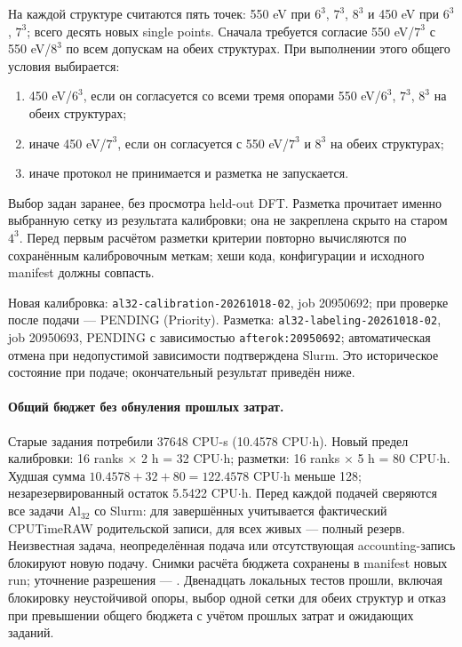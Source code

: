 \documentclass[11pt,a4paper]{article}
\begin{document}
На каждой структуре считаются пять точек: 550 eV при $6^3$, $7^3$,
$8^3$ и 450 eV при $6^3$, $7^3$; всего десять новых single points.
Сначала требуется согласие 550 eV/$7^3$ с 550 eV/$8^3$ по всем допускам
на обеих структурах. При выполнении этого общего условия выбирается:
\begin{enumerate}
\item 450 eV/$6^3$, если он согласуется со всеми тремя опорами
550 eV/$6^3$, $7^3$, $8^3$ на обеих структурах;
\item иначе 450 eV/$7^3$, если он согласуется с 550 eV/$7^3$ и $8^3$
на обеих структурах;
\item иначе протокол не принимается и разметка не запускается.
\end{enumerate}
Выбор задан заранее, без просмотра held-out DFT. Разметка прочитает
именно выбранную сетку из результата калибровки; она не закреплена скрыто
на старом $4^3$. Перед первым расчётом разметки критерии повторно
вычисляются по сохранённым калибровочным меткам; хеши кода, конфигурации
и исходного manifest должны совпасть.

Новая калибровка: \texttt{al32-calibration-20261018-02}, job 20950692;
при проверке после подачи --- PENDING (Priority).
Разметка: \texttt{al32-labeling-20261018-02}, job 20950693,
PENDING с зависимостью \texttt{afterok:20950692}; автоматическая отмена
при недопустимой зависимости подтверждена Slurm.
Это историческое состояние при подаче; окончательный результат приведён ниже.

\paragraph{Общий бюджет без обнуления прошлых затрат.}
Старые задания потребили 37648 CPU-s (10.4578 CPU$\cdot$h).
Новый предел калибровки: 16 ranks $\times$ 2 h = 32 CPU$\cdot$h;
разметки: 16 ranks $\times$ 5 h = 80 CPU$\cdot$h.
Худшая сумма $10.4578+32+80=122.4578$ CPU$\cdot$h меньше 128;
незарезервированный остаток 5.5422 CPU$\cdot$h.
Перед каждой подачей сверяются все задачи Al$_{32}$ со Slurm:
для завершённых учитывается фактический CPUTimeRAW родительской записи,
для всех живых --- полный резерв. Неизвестная задача, неопределённая
подача или отсутствующая accounting-запись блокируют новую подачу.
Снимки расчёта бюджета сохранены в manifest новых run;
уточнение разрешения --- .
Двенадцать локальных тестов прошли, включая блокировку неустойчивой
опоры, выбор одной сетки для обеих структур и отказ при превышении
общего бюджета с учётом прошлых затрат и ожидающих заданий.
\end{document}
